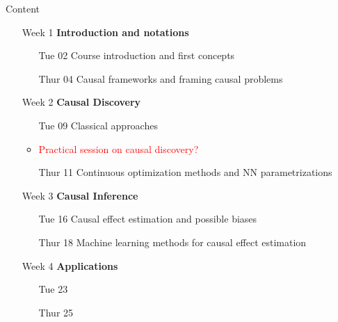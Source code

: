 \documentclass{beamer}
\begin{document}
\begin{frame}{Content}
	\begin{itemize}
		\item[Week 1] \textbf{Introduction and notations}
			\begin{itemize}
				\item[Tue 02] Course introduction and first concepts 


	\item[Thur 04] Causal frameworks and framing causal problems 
			\end{itemize}
		\item[Week 2] \textbf{Causal Discovery} 
			\begin{itemize}
		            \item[Tue 09] Classical approaches 
			    \item<2->[Wed 10?] \textcolor{red}{Practical session on causal discovery?}
		            \item[Thur 11] Continuous optimization methods and NN parametrizations
			\end{itemize}
		\item[Week 3] \textbf{Causal Inference} 
			\begin{itemize}
		            \item[Tue 16] Causal effect estimation and possible biases  
		            \item[Thur 18] Machine learning methods for causal effect estimation
			\end{itemize}
		\item[Week 4] \textbf{Applications} 
			\begin{itemize}
                           \item[Tue 23]  
                           \item[Thur 25] 
			\end{itemize}

	\end{itemize}
\end{frame}
\end{document}
